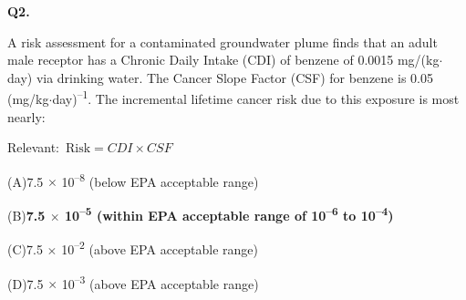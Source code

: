 \documentclass[11pt]{article}
\newcommand{\correct}[1]{\textbf{#1}\;{\color{accent}$\checkmark$}}
\newcommand{\optline}[2]{\par\noindent\hspace{1.2em}(#1)\hspace{0.6em}#2}
\begin{document}
\vspace{9pt}
\filbreak
\textbf{\color{accent}Q2.}\quad {\small\color{soft}[D13-Q02 \textbullet\ MCQ \textbullet\ Carcinogen risk --- Risk = CDI $\times$ CSF (SI)]}\par\vspace{2pt}
A risk assessment for a contaminated groundwater plume finds that an adult male receptor has a Chronic Daily Intake (CDI) of benzene of 0.0015 mg/(kg$\cdot$day) via drinking water. The Cancer Slope Factor (CSF) for benzene is 0.05 (mg/kg$\cdot$day)\textsuperscript{--}\textsuperscript{1}. The incremental lifetime cancer risk due to this exposure is most nearly:\par\vspace{3pt}
{\small\color{soft}Relevant:}\ $\text{Risk} = CDI \times CSF$\par\vspace{3pt}
\optline{A}{7.5 $\times$ 10\textsuperscript{--}\textsuperscript{8} (below EPA acceptable range)}
\optline{B}{\correct{7.5 $\times$ 10\textsuperscript{--}\textsuperscript{5} (within EPA acceptable range of 10\textsuperscript{--}\textsuperscript{6} to 10\textsuperscript{--}\textsuperscript{4})}}
\optline{C}{7.5 $\times$ 10\textsuperscript{--}\textsuperscript{2} (above EPA acceptable range)}
\optline{D}{7.5 $\times$ 10\textsuperscript{--}\textsuperscript{3} (above EPA acceptable range)}
\par\vspace{3pt}
\end{document}
